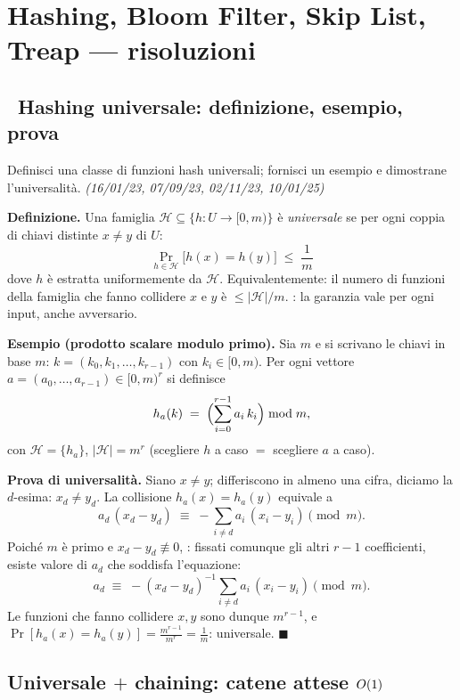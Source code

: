 \section{Hashing, Bloom Filter, Skip List, Treap --- risoluzioni}

\subsection*{\hot\ Hashing universale: definizione, esempio, prova}

\begin{domanda}
Definisci una classe di funzioni hash universali; fornisci un esempio e dimostrane
l'universalit\`a. \emph{(16/01/23, 07/09/23, 02/11/23, 10/01/25)}
\end{domanda}

\textbf{Definizione.} Una famiglia $\mathcal{H}\subseteq\{h:U\to[0,m)\}$ \`e \emph{universale} se
per ogni coppia di chiavi distinte $x\ne y$ di $U$:
\[
\boxed{\ \Pr_{h\in\mathcal{H}}\bigl[h(x)=h(y)\bigr]\;\le\;\frac{1}{m}\ }
\]
dove $h$ \`e estratta uniformemente da $\mathcal{H}$. Equivalentemente: il numero di funzioni
della famiglia che fanno collidere $x$ e $y$ \`e $\le|\mathcal{H}|/m$. : la garanzia vale per ogni input, anche avversario.

\textbf{Esempio (prodotto scalare modulo primo).} Sia $m$  e si scrivano le chiavi in
base $m$: $k=(k_0,k_1,\dots,k_{r-1})$ con $k_i\in[0,m)$. Per ogni vettore
$a=(a_0,\dots,a_{r-1})\in[0,m)^r$ si definisce
\[
h_a(k)\;=\;\Bigl(\sum_{i=0}^{r-1}a_i\,k_i\Bigr)\bmod m ,
\]
con $\mathcal{H}=\{h_a\}$, $|\mathcal{H}|=m^r$ (scegliere $h$ a caso $=$ scegliere $a$ a caso).

\textbf{Prova di universalit\`a.} Siano $x\ne y$; differiscono in almeno una cifra, diciamo la
$d$-esima: $x_d\ne y_d$. La collisione $h_a(x)=h_a(y)$ equivale a
\[
a_d\,(x_d-y_d)\;\equiv\;-\!\!\sum_{i\ne d}a_i\,(x_i-y_i) \pmod m .
\]
Poich\'e $m$ \`e primo e $x_d-y_d\not\equiv0$, :
fissati comunque gli altri $r-1$ coefficienti, esiste  valore di $a_d$ che
soddisfa l'equazione:
\[
a_d\;\equiv\;-(x_d-y_d)^{-1}\!\!\sum_{i\ne d}a_i\,(x_i-y_i)\pmod m .
\]
Le funzioni che fanno collidere $x,y$ sono dunque $m^{r-1}$, e
$\Pr[h_a(x)=h_a(y)]=\frac{m^{r-1}}{m^{r}}=\frac{1}{m}$: universale. $\blacksquare$

\subsection*{ Universale $+$ chaining: catene attese $O\!\left(1\right)$}

